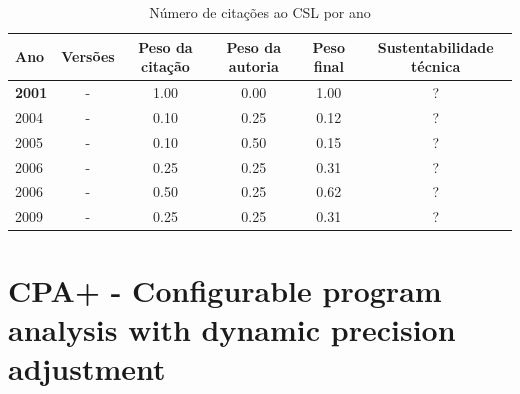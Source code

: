 \begin{table}[H]
\caption{Número de citações ao CSL  por ano}
\centering
\begin{tabular}{| l | c | c | c | c | c |}
  \hline
  Ano & Versões & Peso da citação & Peso da autoria & Peso final & Sustentabilidade técnica \\
  \hline
            {\bf 2001}
          &
          -
          &
          1.00
          &
          0.00
          &
            {\color{blue} 1.00}
          &
          ?
          \\
\hline
            2004
          &
          -
          &
          0.10
          &
          0.25
          &
            {\color{red} 0.12}
          &
          ?
          \\
\hline
            2005
          &
          -
          &
          0.10
          &
          0.50
          &
            {\color{red} 0.15}
          &
          ?
          \\
\hline
            2006
          &
          -
          &
          0.25
          &
          0.25
          &
            {\color{red} 0.31}
          &
          ?
          \\
            2006
          &
          -
          &
          0.50
          &
          0.25
          &
            {\color{blue} 0.62}
          &
          ?
          \\
\hline
            2009
          &
          -
          &
          0.25
          &
          0.25
          &
            {\color{red} 0.31}
          &
          ?
          \\
\hline
\end{tabular}
\end{table}



\section{CPA+ - Configurable program analysis with dynamic precision adjustment}




